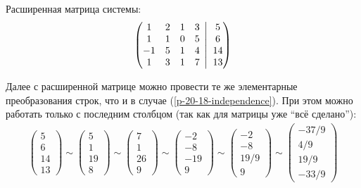 \documentclass[a4paper,12pt]{article}
\newcommand{\BigMiddleFour}{\;\left|\vphantom{\begin{pmatrix} 0\\0\\0\\0 \end{pmatrix}}\right.\;}
\begin{document}
  Расширенная матрица системы:
  \[
    \left(
      \begin{matrix}
        1 & 2 & 1 & 3\\
        1 & 1 & 0 & 5\\
        -1 & 5 & 1 & 4\\
        1 & 3 & 1 & 7
      \end{matrix}
      \BigMiddleFour
      \begin{matrix}
        5 \\ 6 \\ 14 \\ 13
      \end{matrix}
    \right)
  \]
  
  Далее с расширенной матрице можно провести те же элементарные преобразования строк, что и в случае (\ref{p-20-18-independence}).
  При этом можно работать только с последним столбцом (так как для матрицы уже ``всё сделано''):
  \begin{equation*}
  \begin{split}
    \begin{pmatrix} 5 \\ 6 \\ 14 \\ 13 \end{pmatrix}
    \sim \begin{pmatrix} 5 \\ 1 \\ 19 \\ 8 \end{pmatrix}
    \sim \begin{pmatrix} 7 \\ 1 \\ 26 \\ 9 \end{pmatrix}
    \sim \begin{pmatrix} -2 \\ -8 \\ -19 \\ 9 \end{pmatrix}
    \sim \begin{pmatrix} -2 \\ -8 \\ 19/9 \\ 9 \end{pmatrix}
    \sim \begin{pmatrix} -37/9 \\ 4/9 \\ 19/9 \\ -33/9 \end{pmatrix}
  \end{split}
  \end{equation*}
  
\end{document}

